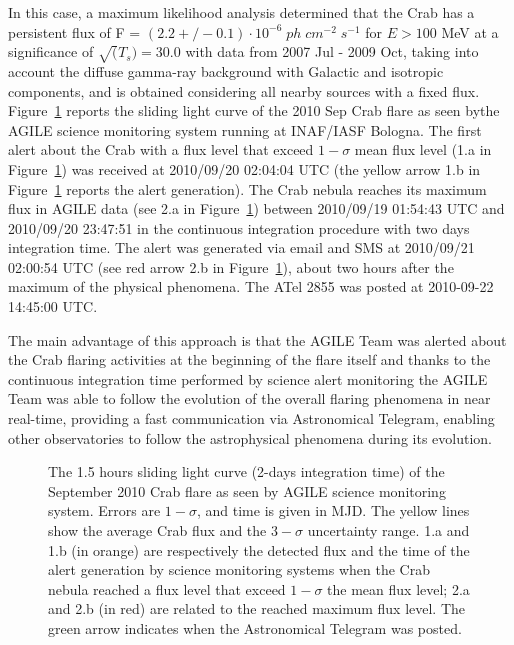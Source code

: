 In this case, a maximum likelihood analysis determined that the Crab has a persistent flux of F = $(2.2 +/- 0.1) \cdot 10^{-6} \; ph \; cm^{-2} \; s^{-1}$ for $E > 100$ MeV at a significance of $\sqrt(T_s) = 30.0$ with data from 2007 Jul - 2009 Oct, taking into account the diffuse gamma-ray background with Galactic and isotropic components, and is obtained considering all nearby sources with a fixed flux. Figure~\ref{fig_crab} reports the sliding light curve of the  2010 Sep Crab flare as seen bythe  AGILE science monitoring system running at INAF/IASF Bologna. The first alert about the Crab with a flux level that exceed $1-\sigma$ mean flux level (1.a in Figure~\ref{fig_crab}) was received at 2010/09/20 02:04:04 UTC (the yellow arrow 1.b in Figure~\ref{fig_crab} reports the alert generation). The Crab nebula reaches its maximum flux in AGILE data (see 2.a in Figure~\ref{fig_crab}) between 2010/09/19 01:54:43 UTC and 2010/09/20 23:47:51 in the continuous integration procedure with two days integration time. The alert was generated via email and SMS at 2010/09/21 02:00:54 UTC (see red arrow 2.b in Figure~\ref{fig_crab}), about two hours after the maximum of the physical phenomena. The ATel 2855 \citep{Tavani:ATEL} was posted at 2010-09-22 14:45:00 UTC.
      
The main advantage  of this approach is that the AGILE Team was alerted about the Crab flaring activities at the beginning of the flare itself and thanks to the continuous integration time performed by science alert monitoring the AGILE Team was able to follow the evolution of the overall flaring phenomena in near real-time, providing a fast communication via Astronomical Telegram, enabling other observatories to follow the astrophysical phenomena during its evolution.
      
\begin{figure}[t]
\caption{The 1.5 hours sliding light curve (2-days integration time) of the September 2010 Crab flare as seen by AGILE science monitoring system. Errors are $1-\sigma$, and time is given in MJD. The yellow lines show the average Crab flux and the $3-\sigma$ uncertainty range. 1.a and 1.b (in orange) are respectively the detected flux and the time of the alert generation by science monitoring systems when the Crab nebula reached a flux level that exceed $1-\sigma$ the mean flux level; 2.a and 2.b (in red) are related to the reached maximum flux level. The green arrow indicates when the Astronomical Telegram was posted.} \label{fig_crab}
\end{figure}

